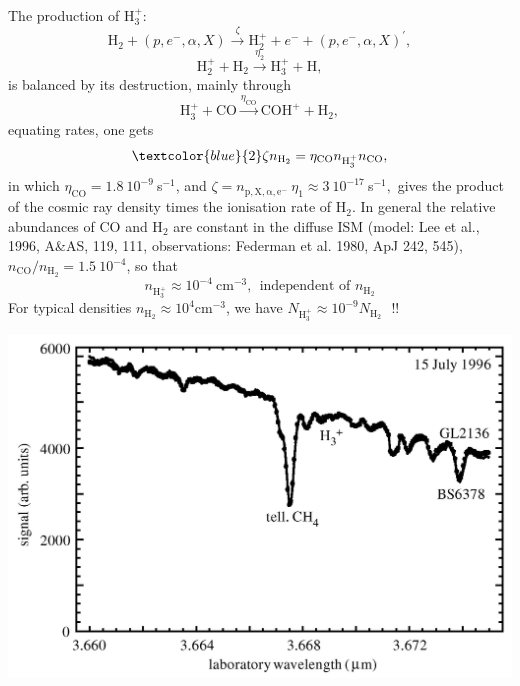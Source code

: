\foilhead{}

The production of  H$_3^+$: 
\[ \mathrm{H}_2 + (p,e^-,\alpha,X) \stackrel{\zeta}{\rightarrow}
\mathrm{H}_2^+ + e^- +  (p,e^-,\alpha,X)^\prime, \]
\[\mathrm{H}_2^+ +   \mathrm{H}_2 \stackrel{\eta_2} {\rightarrow} \mathrm{H}_3^+ + \mathrm{H},\]
is balanced by its destruction, mainly through
\[ \mathrm{H}_3^+ + \mathrm{CO} \stackrel{\eta_\mathrm{CO}}{ \rightarrow} \mathrm{COH^+} +
\mathrm{H}_2, \]
equating rates, one gets
\[ \textcolor{blue}{2} \zeta n_\mathrm{H_2} = \eta_\mathrm{CO} n_\mathrm{H_3^+}
n_\mathrm{CO} ,\] in which $\eta_\mathrm{CO} = 1.8~10^{-9}~$s$^{-1}$,
and $\zeta = n_\mathrm{p,X,\alpha,e^{-}} ~\eta_1 \approx
3~10^{-17}~$s$^{-1},$ gives the product of the cosmic ray density
times the ionisation rate of H$_2$. In general the relative abundances
of CO and H$_2$ are constant in the diffuse ISM (model: Lee et al.,
1996, A\&AS, 119, 111, observations: Federman et al. 1980, ApJ 242,
545), $n_\mathrm{CO}/n_\mathrm{H_2} = 1.5~10^{-4}$, so that
\[ \boxed{ n_\mathrm{H_3^+}  \approx 10^{-4}~\mathrm{cm^{-3}}, ~~\text{independent of $n_\mathrm{H_2}$}} \]
For typical densities  $n_\mathrm{H_2} \approx 10^{4}
\mathrm{cm^{-3}}$, we have $N_{\mathrm{H}_3^+} \approx 10^{-9} N_{\mathrm{H}_2}~~~ \text{!!}$





\foilhead{}
\begin{center}
  \includegraphics[width=25cm,height=!]{./B/h3_rawspec.jpg}
\end{center}


